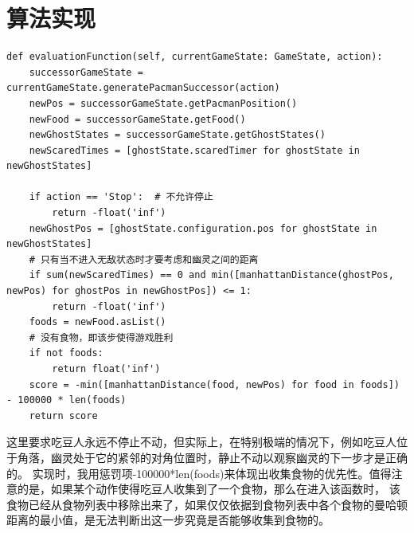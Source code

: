 \section{算法实现}
%
%
\begin{lstlisting}[emph={[3]currentGameState,action},emphstyle={[3]\color{vscode_parametercolor}},emph={[4]GameState},emphstyle={[4]\color{vscode_classcolor}}]
def evaluationFunction(self, currentGameState: GameState, action):
    successorGameState = currentGameState.generatePacmanSuccessor(action)
    newPos = successorGameState.getPacmanPosition()
    newFood = successorGameState.getFood()
    newGhostStates = successorGameState.getGhostStates()
    newScaredTimes = [ghostState.scaredTimer for ghostState in newGhostStates]

    if action == 'Stop':  # 不允许停止
        return -float('inf')
    newGhostPos = [ghostState.configuration.pos for ghostState in newGhostStates]
    # 只有当不进入无敌状态时才要考虑和幽灵之间的距离
    if sum(newScaredTimes) == 0 and min([manhattanDistance(ghostPos, newPos) for ghostPos in newGhostPos]) <= 1:
        return -float('inf')
    foods = newFood.asList()
    # 没有食物，即该步使得游戏胜利
    if not foods:
        return float('inf')
    score = -min([manhattanDistance(food, newPos) for food in foods]) - 100000 * len(foods)
    return score
\end{lstlisting}
这里要求吃豆人永远不停止不动，但实际上，在特别极端的情况下，例如吃豆人位于角落，幽灵处于它的紧邻的对角位置时，静止不动以观察幽灵的下一步才是正确的。
实现时，我用惩罚项-100000*len(foods)来体现出收集食物的优先性。值得注意的是，如果某个动作使得吃豆人收集到了一个食物，那么在进入该函数时，
该食物已经从食物列表中移除出来了，如果仅仅依据到食物列表中各个食物的曼哈顿距离的最小值，是无法判断出这一步究竟是否能够收集到食物的。
